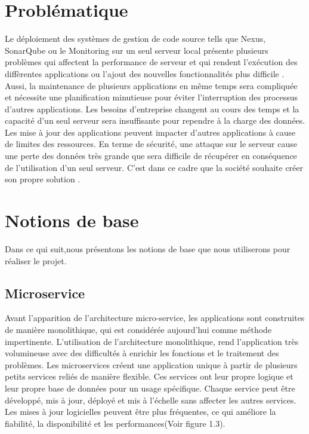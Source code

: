 \section{\selectfont\Large Problématique }
Le déploiement des systèmes de gestion de code source tells que Nexus, SonarQube ou le Monitoring sur un seul serveur local présente plusieurs problèmes qui affectent la performance de serveur et qui rendent l’exécution des diffèrentes applications ou l’ajout des nouvelles fonctionnalités plus difficile . Aussi, la maintenance de plusieurs applications en même temps sera compliquée et nécessite une planification minutieuse pour éviter l’interruption des processus d’autres applications. Les besoins d’entreprise changent au cours des temps et la capacité d'un seul serveur sera insuffisante pour rependre à la charge des données. Les mise à jour des applications peuvent impacter d'autres applications à cause de limites des ressources. En terme de sécurité, une attaque sur le serveur cause une perte des données très grande que sera difficile de récupérer en conséquence de l’utilisation d'un seul serveur.
C'est dans ce cadre que la société souhaite créer son propre solution .
\section{\selectfont\Large Notions de base}
 Dans ce qui suit,nous présentons les notions de base que nous utiliserons pour réaliser le projet.
\subsection{\selectfont\Large  Microservice}
    Avant l'apparition de l'architecture micro-service, les applications sont construites de manière monolithique, qui est considérée aujourd’hui comme méthode impertinente. L’utilisation de l'architecture monolithique, rend l’application très
    volumineuse avec des difficultés à enrichir les fonctions et le traitement des problèmes.
    Les microservices créent une application unique à partir de plusieurs petits services reliés de manière flexible.
    Ces services ont leur propre logique et leur propre base de données pour un usage spécifique. Chaque service peut être développé, mis à jour, déployé et mis à l’échelle sans affecter les autres services. Les mises à jour logicielles peuvent être plus fréquentes, ce qui améliore la fiabilité, la disponibilité et les performances(Voir figure 1.3). 

